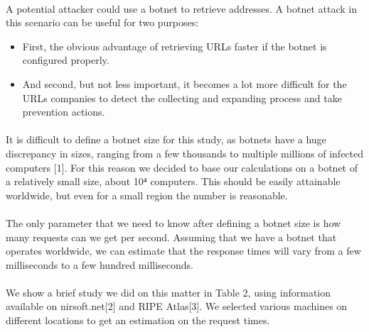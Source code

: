 \documentclass[12pt]{article}
\begin{document}
\paragraph{}
A potential attacker could use a botnet to retrieve addresses. A botnet attack in this scenario can be useful for two purposes:

\begin{itemize}

\item  First, the obvious advantage of retrieving URLs faster if the botnet is configured properly.

\item  And second, but not less important, it becomes a lot more difficult for the URLs companies to detect the collecting and expanding process and take prevention actions.

\end{itemize}

\paragraph{}
It is difficult to define a botnet size for this study, as botnets have a huge discrepancy in sizes, ranging from a few thousands to multiple millions of infected computers [1]. For this reason we decided to base our calculations on a botnet of a relatively small size, about 10⁴ computers. This should be easily attainable worldwide, but even for a small region the number is reasonable.

\paragraph{}
The only parameter that we need to know after defining a botnet size is how many requests can we get per second. Assuming that we have a botnet that operates worldwide, we can estimate that the response times will vary from a few milliseconds to a few hundred milliseconds.

\paragraph{}
We show a brief study we did on this matter in Table 2, using information available on nirsoft.net[2] and RIPE Atlas[3]. We selected various machines on different locations to get an estimation on the request times.
\end{document}
